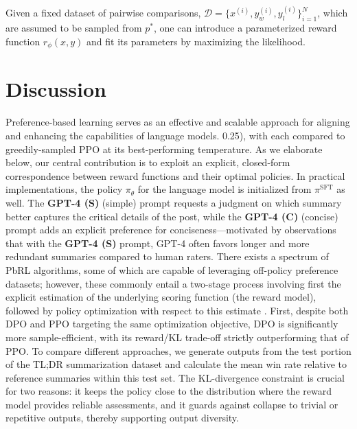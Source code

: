 \begin{lemma}
\begin{sproof}
Given a fixed dataset of pairwise comparisons, $\mathcal{D}=\bigl\{x^{(i)}, y_w^{(i)}, y_l^{(i)}\bigr\}_{i=1}^N$, which are assumed to be sampled from $p^*$, one can introduce a parameterized reward function $r_{\phi}(x, y)$ and fit its parameters by maximizing the likelihood. \section{Discussion}
Preference-based learning serves as an effective and scalable approach for aligning and enhancing the capabilities of language models. 0.25), with each compared to greedily-sampled PPO at its best-performing temperature. As we elaborate below, our central contribution is to exploit an explicit, closed-form correspondence between reward functions and their optimal policies. In practical implementations, the policy $\pi_\theta$ for the language model is initialized from $\pi^\text{SFT}$ as well. The \textbf{GPT-4 (S)} (simple) prompt requests a judgment on which summary better captures the critical details of the post, while the \textbf{GPT-4 (C)} (concise) prompt adds an explicit preference for conciseness—motivated by observations that with the \textbf{GPT-4 (S)} prompt, GPT-4 often favors longer and more redundant summaries compared to human raters. There exists a spectrum of PbRL algorithms, some of which are capable of leveraging off-policy preference datasets; however, these commonly entail a two-stage process involving first the explicit estimation of the underlying scoring function (the reward model), followed by policy optimization with respect to this estimate \citep{jain2013learning,BusaFekete2014,christiano2017deep,sadigh2017active,kupcsik2018learning}. First, despite both DPO and PPO targeting the same optimization objective, DPO is significantly more sample-efficient, with its reward/KL trade-off strictly outperforming that of PPO. To compare different approaches, we generate outputs from the test portion of the TL;DR summarization dataset and calculate the mean win rate relative to reference summaries within this test set. The KL-divergence constraint is crucial for two reasons: it keeps the policy close to the distribution where the reward model provides reliable assessments, and it guards against collapse to trivial or repetitive outputs, thereby supporting output diversity. \label{sec:theory}


\end{sproof}
\end{lemma}
